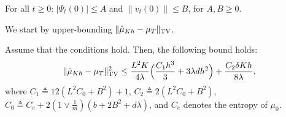 %
\begin{assumption}
\label{asmp:init_fun}
For all $t \geq 0$: $|\Psi_t(0)| \leq A$ and $\|v_t(0)\| \leq B$,
for $A,B \geq 0$.
\end{assumption}


 
We start by upper-bounding $\| \hat{\mu}_{Kh} - \mu_T \|_{\textnormal{TV}}$. 
%
\begin{lemma}
\label{lem:euler}
Assume that the conditions  hold. Then, the following bound holds:
\begin{align}
\| \hat{\mu}_{Kh} - \mu_{T} \|_{\textnormal{TV}}^2 \leq \frac{L^2 K}{4\lambda} \Bigl( \frac{C_1 h^3}{3} + 3 \lambda d h^2 \Bigr) + \frac{C_2 \delta K h}{8\lambda},
\end{align}
where $C_1 \triangleq 12(L^2 C_0 + B^2)+1$, $C_2 \triangleq 2 (L^2 C_0 + B^2)$, $C_0 \triangleq C_e +2  (1 \vee \frac1{m})(b+2B^2 + d \lambda)$, and $C_e$ denotes the entropy of $\mu_0$.
\end{lemma}
%
